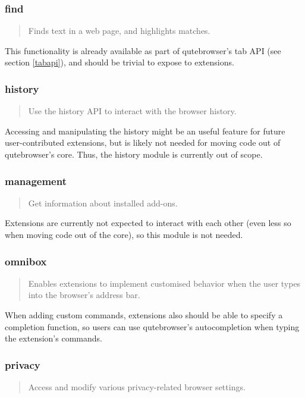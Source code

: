 \subsubsection{find}
\begin{quote}
Finds text in a web page, and highlights matches.
\end{quote}

This functionality is already available as part of qutebrowser's tab API (see
section \ref{tabapi}), and should be trivial to expose to extensions.

\subsubsection{history}
\begin{quote}
Use the history API to interact with the browser history.
\end{quote}

Accessing and manipulating the history might be an useful feature for future
user-contributed extensions, but is likely not needed for moving code out of
qutebrowser's core. Thus, the history module is currently out of scope.

\subsubsection{management}
\begin{quote}
Get information about installed add-ons.
\end{quote}

Extensions are currently not expected to interact with each other (even less so
when moving code out of the core), so this module is not needed.

\subsubsection{omnibox}
\begin{quote}
Enables extensions to implement customised behavior when the user types into the
browser's address bar.
\end{quote}

When adding custom commands, extensions also should be able to specify a
completion function, so users can use qutebrowser's autocompletion when typing
the extension's commands.

\subsubsection{privacy}
\begin{quote}
Access and modify various privacy-related browser settings.
\end{quote}

